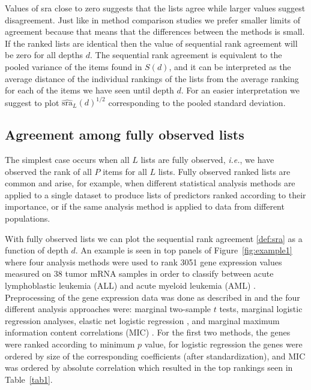 \documentclass[12pt,a4paper]{article}
\makeatletter
\newcommand{\ie}{\emph{i.e.}\@\xspace}
\theoremstyle{plain}
\makeatother
\begin{document}
Values of \textrm{sra} close to zero suggests that the lists agree
while larger values suggest disagreement.
Just like in method comparison studies we prefer smaller limits of
agreement because that means that the differences between the methods
is small. If the ranked lists are identical then the value of
sequential rank agreement will be zero for all depths $d$.
The sequential rank agreement is  equivalent to the pooled
variance of the items found in $S(d)$, and it can be interpreted as the
average distance of the individual rankings of the lists from the
average ranking for each of the items we have seen until depth $d$.
For an easier interpretation we suggest to plot $\widehat{\textrm{sra}}_L(d)^{1/2}$ 
corresponding to the pooled standard deviation. 



\subsection{Agreement among fully observed lists}
\label{sec:amfol}

The simplest case occurs when all $L$ lists are fully observed, \ie,
we have observed the rank of all $P$ items for all $L$ lists. Fully
observed ranked lists are common and arise, for example, when
different statistical analysis methods are applied to a single dataset
to produce lists of predictors ranked according to their importance,
or if the same analysis method is applied to data from different
populations.

With fully observed lists we can plot the sequential rank agreement
\ref{def:sra} as a function of depth $d$. An example is seen in top
panels of Figure~\ref{fig:example1} where four analysis methods were
used to rank 3051 gene expression values measured on 38 tumor mRNA
samples in order to classify between acute lymphoblastic leukemia
(ALL) and acute myeloid leukemia (AML)
\citep{Golub1999}. Preprocessing of the gene expression data was done
as described in \citet{Dudoit2002} and the four different analysis
approaches were: marginal two-sample $t$ tests, marginal logistic
regression analyses, elastic net logistic regression
\citep{friedman2010regularization}, and marginal maximum information
content correlations (MIC) \citep{Reshef2011}. For the first two
methods, the genes were ranked according to minimum $p$ value, for
logistic regression the genes were ordered by size of the
corresponding coefficients (after standardization), and MIC was
ordered by absolute correlation which resulted in the top rankings
seen in Table~\ref{tab1}.
\end{document}
